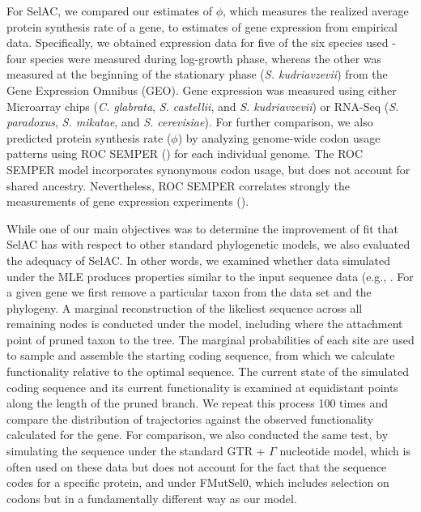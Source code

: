 \documentclass{article}
\newcommand{\selac}{SelAC\xspace}
\begin{document}
For SelAC, we compared our estimates of $\phi$, which measures the realized average protein synthesis rate of a gene, to estimates of gene expression from empirical data.
Specifically, we obtained expression data for five of the six species used - four species were measured during log-growth phase, whereas the other was measured at the beginning of the stationary phase (\emph{S. kudriavzevii}) from the Gene Expression Omnibus (GEO). 
Gene expression was measured using either Microarray chips (\emph{C. glabrata}, \emph{S. castellii}, and \emph{S. kudriavzevii}) or RNA-Seq (\emph{S. paradoxus}, \emph{S. mikatae}, and \emph{S. cerevisiae}).
For further comparison, we also predicted protein synthesis rate ($\phi$) by analyzing genome-wide codon usage patterns using ROC SEMPER (\citet{GilchristEtAl2015}) for each individual genome.
The ROC SEMPER model incorporates synonymous codon usage, but does not account for shared ancestry.
Nevertheless, ROC SEMPER correlates strongly the measurements of gene expression experiments (\citet{GilchirstEtAl2015}).

While one of our main objectives was to determine the improvement of fit that \selac has with respect to other standard phylogenetic models, we also evaluated the adequacy of \selac.
In other words, we examined whether data simulated under the MLE produces properties similar to the input sequence data (e.g., \citet{BeaulieuEtAl2013}.
For a given gene we first remove a particular taxon from the data set and the phylogeny.
A marginal reconstruction of the likeliest sequence across all remaining nodes is conducted under the model, including where the attachment point of pruned taxon to the tree.
The marginal probabilities of each site are used to sample and assemble the starting coding sequence, from which we calculate functionality relative to the optimal sequence.
The current state of the simulated coding sequence and its current functionality is examined at equidistant points along the length of the pruned branch.
We repeat this process 100 times and compare the distribution of trajectories against the observed functionality calculated for the gene.
For comparison, we also conducted the same test, by simulating the sequence under the standard GTR + $\Gamma$ nucleotide model, which is often used on these data but does not account for the fact that the sequence codes for a specific protein, and under FMutSel0, which includes selection on codons but in a fundamentally different way as our model.



\end{document}
